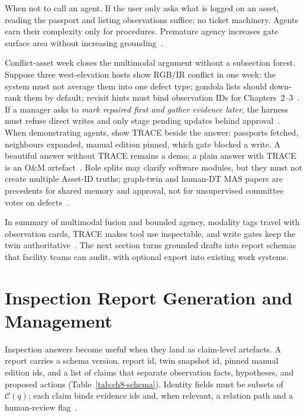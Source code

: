 When not to call an agent. If the user only asks what is logged on an asset, reading the passport and listing observations suffice; no ticket machinery. Agents earn their complexity only for procedures. Premature agency increases gate surface area without increasing grounding~\cite{yao2023react,wang2024surveyagents}.




Conflict-asset week closes the multimodal argument without a subsection forest. Suppose three west-elevation hosts show RGB/IR conflict in one week: the system must not average them into one defect type; gondola lists should down-rank them by default; revisit hints must bind observation IDs for Chapters~2--3~\cite{zhao2024facade,zhao2026physical,luo2025llmdtrobot}. If a manager asks to \emph{mark repaired first and gather evidence later}, the harness must refuse direct writes and only stage pending updates behind approval~\cite{gao2026ifcagent,lu2026highwaymas}. When demonstrating agents, show TRACE beside the answer: passports fetched, neighbours expanded, manual edition pinned, which gate blocked a write. A beautiful answer without TRACE remains a demo; a plain answer with TRACE is an O\&M artefact~\cite{wang2024surveyagents,liang2023helm,hellin2025bimmas}. Role splits may clarify software modules, but they must not create multiple Asset-ID truths; graph-twin and human-DT MAS papers are precedents for shared memory and approval, not for unsupervised committee votes on defects~\cite{pan2026graphdtgpt,lu2026highwaymas,rawat2025llmmas,koh2026bimllmretr}.



In summary of multimodal fusion and bounded agency, modality tags travel with observation cards, TRACE makes tool use inspectable, and write gates keep the twin authoritative~\cite{zhao2026physical,yao2023react,luo2025llmdtrobot,lu2026highwaymas}. The next section turns grounded drafts into report schemas that facility teams can audit, with optional export into existing work systems.

\section{Inspection Report Generation and Management}
\label{sec:ch8-reports}

Inspection answers become useful when they land as claim-level artefacts. A report carries a schema version, report id, twin snapshot id, pinned manual edition ids, and a list of claims that separate observation facts, hypotheses, and proposed actions (Table~\ref{tab:ch8-schema}). Identity fields must be subsets of~$\mathcal{C}(q)$; each claim binds evidence ids and, when relevant, a relation path and a human-review flag~\cite{zheng2023bimassistant,joffe2025buildingcodes,ji2023}.

